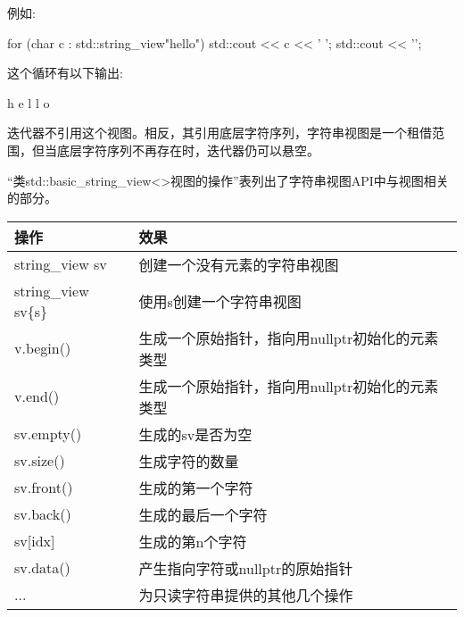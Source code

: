 例如:

\begin{cpp}
for (char c : std::string_view{"hello"}) {
	std::cout << c << ' ';
}
std::cout << '\n';
\end{cpp}

这个循环有以下输出:

\begin{shell}
h e l l o
\end{shell}


迭代器不引用这个视图。相反，其引用底层字符序列，字符串视图是一个租借范围，但当底层字符序列不再存在时，迭代器仍可以悬空。


“类std::basic\_string\_view<>视图的操作”表列出了字符串视图API中与视图相关的部分。

\begin{longtable}[c]{|l|l|}
\hline
\textbf{操作}   & \textbf{效果}                                                       \\ \hline
\endfirsthead
%
\endhead
%
string\_view sv      & 创建一个没有元素的字符串视图                                \\ \hline
string\_view sv\{s\} & 使用s创建一个字符串视图                                            \\ \hline
v.begin()            & 生成一个原始指针，指向用nullptr初始化的元素类型 \\ \hline
v.end()              & 生成一个原始指针，指向用nullptr初始化的元素类型 \\ \hline
sv.empty()           & 生成的sv是否为空                                            \\ \hline
sv.size()            & 生成字符的数量                                       \\ \hline
sv.front()           & 生成的第一个字符                                            \\ \hline
sv.back()            & 生成的最后一个字符                                             \\ \hline
sv{[}idx{]}          & 生成的第n个字符                                              \\ \hline
sv.data()            & 产生指向字符或nullptr的原始指针                     \\ \hline
...                  & 为只读字符串提供的其他几个操作               \\ \hline
\end{longtable}

